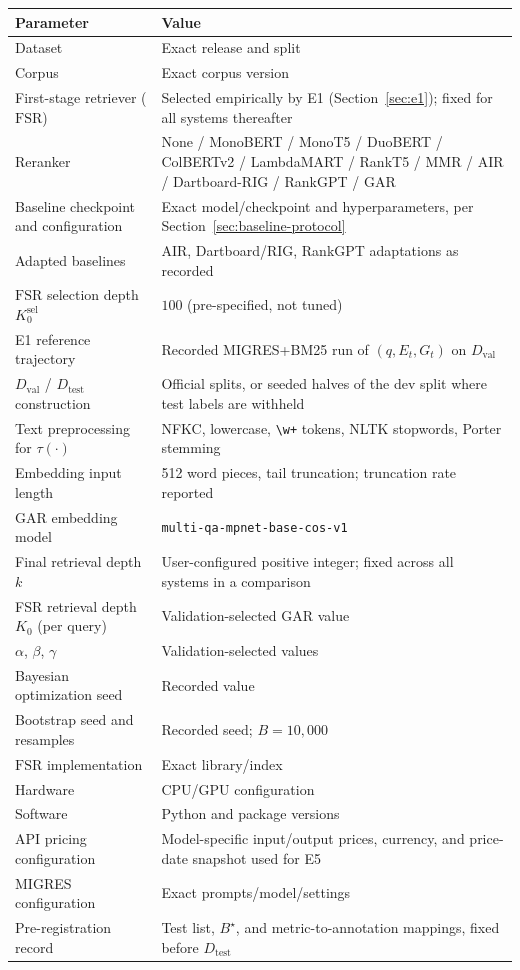 \documentclass[11pt,a4paper]{article}
\begin{document}
\begin{center}
\small
\begin{tabularx}{\textwidth}{l X}
\toprule
\textbf{Parameter} & \textbf{Value}\\
\midrule
Dataset & Exact release and split\\
Corpus & Exact corpus version\\
First-stage retriever ($\mathrm{FSR}$) & Selected empirically by E1 (Section~\ref{sec:e1}); fixed for all systems thereafter\\
Reranker & None / MonoBERT / MonoT5 / DuoBERT / ColBERTv2 / LambdaMART / RankT5 / MMR / AIR / Dartboard-RIG / RankGPT / GAR\\
Baseline checkpoint and configuration & Exact model/checkpoint and hyperparameters, per Section~\ref{sec:baseline-protocol}\\
Adapted baselines & AIR, Dartboard/RIG, RankGPT adaptations as recorded\\
$\mathrm{FSR}$ selection depth $K_0^{\mathrm{sel}}$ & $100$ (pre-specified, not tuned)\\
E1 reference trajectory & Recorded MIGRES+BM25 run of $(q,E_t,G_t)$ on $D_{\mathrm{val}}$\\
$D_{\mathrm{val}}$ / $D_{\mathrm{test}}$ construction & Official splits, or seeded halves of the dev split where test labels are withheld\\
Text preprocessing for $\tau(\cdot)$ & NFKC, lowercase, \texttt{\textbackslash w+} tokens, NLTK stopwords, Porter stemming\\
Embedding input length & 512 word pieces, tail truncation; truncation rate reported\\
GAR embedding model & \texttt{multi-qa-mpnet-base-cos-v1}\\
Final retrieval depth $k$ & User-configured positive integer; fixed across all systems in a comparison\\
FSR retrieval depth $K_0$ (per query) & Validation-selected GAR value\\
$\alpha$, $\beta$, $\gamma$ & Validation-selected values\\
Bayesian optimization seed & Recorded value\\
Bootstrap seed and resamples & Recorded seed; $B=10{,}000$\\
$\mathrm{FSR}$ implementation & Exact library/index\\
Hardware & CPU/GPU configuration\\
Software & Python and package versions\\
API pricing configuration & Model-specific input/output prices, currency, and price-date snapshot used for E5\\
MIGRES configuration & Exact prompts/model/settings\\
Pre-registration record & Test list, $B^\star$, and metric-to-annotation mappings, fixed before $D_{\mathrm{test}}$\\
\bottomrule
\end{tabularx}
\end{center}
\end{document}
